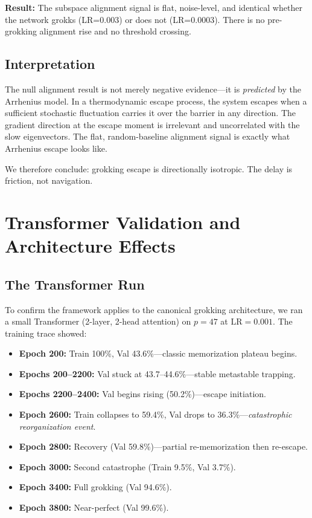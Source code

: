 \documentclass[11pt,twocolumn]{article}
\begin{document}
\textbf{Result:} The subspace alignment signal is flat, noise-level, and identical whether the network grokks (LR=0.003) or does not (LR=0.0003). There is no pre-grokking alignment rise and no threshold crossing.

\subsection{Interpretation}

The null alignment result is not merely negative evidence---it is \emph{predicted} by the Arrhenius model. In a thermodynamic escape process, the system escapes when a sufficient stochastic fluctuation carries it over the barrier in any direction. The gradient direction at the escape moment is irrelevant and uncorrelated with the slow eigenvectors. The flat, random-baseline alignment signal is exactly what Arrhenius escape looks like.

We therefore conclude: grokking escape is directionally isotropic. The delay is friction, not navigation.

\section{Transformer Validation and Architecture Effects}
\label{sec:transformer}

\subsection{The Transformer Run}

To confirm the framework applies to the canonical grokking architecture, we ran a small Transformer (2-layer, 2-head attention) on $p=47$ at $\mathrm{LR}=0.001$. The training trace showed:

\begin{itemize}[itemsep=1pt]
\item \textbf{Epoch 200:} Train 100\%, Val 43.6\%---classic memorization plateau begins.
\item \textbf{Epochs 200--2200:} Val stuck at 43.7--44.6\%---stable metastable trapping.
\item \textbf{Epochs 2200--2400:} Val begins rising (50.2\%)---escape initiation.
\item \textbf{Epoch 2600:} Train collapses to 59.4\%, Val drops to 36.3\%---\emph{catastrophic reorganization event}.
\item \textbf{Epoch 2800:} Recovery (Val 59.8\%)---partial re-memorization then re-escape.
\item \textbf{Epoch 3000:} Second catastrophe (Train 9.5\%, Val 3.7\%).
\item \textbf{Epoch 3400:} Full grokking (Val 94.6\%).
\item \textbf{Epoch 3800:} Near-perfect (Val 99.6\%).
\end{itemize}
\end{document}
